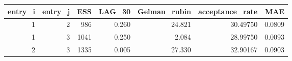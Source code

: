 \begin{longtable}{rrrrrrr}
\toprule
entry\_i & entry\_j & ESS & LAG\_30 & Gelman\_rubin & acceptance\_rate & MAE \\ 
\midrule
1 & 2 & 986 & 0.260 & 24.821 & 30.49750 & 0.0809 \\ 
1 & 3 & 1041 & 0.250 & 2.084 & 28.99750 & 0.0093 \\ 
2 & 3 & 1335 & 0.005 & 27.330 & 32.90167 & 0.0903 \\ 
\bottomrule
\end{longtable}

